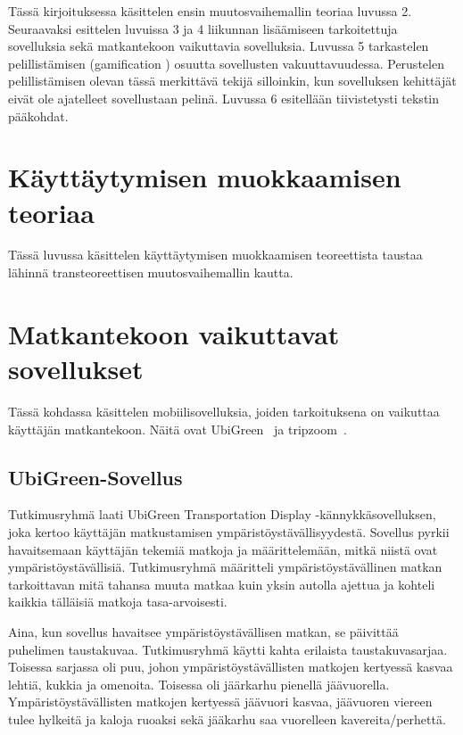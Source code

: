 \documentclass[finnish]{tktltiki2}
\theoremstyle{definition}
\theoremstyle{remark}
\begin{document}
Tässä kirjoituksessa käsittelen ensin muutosvaihemallin teoriaa luvussa 2.
Seuraavaksi esittelen luvuissa 3 ja 4 liikunnan lisäämiseen tarkoitettuja sovelluksia sekä matkantekoon vaikuttavia sovelluksia.
Luvussa 5 tarkastelen pelillistämisen (gamification \cite{gamification}) osuutta sovellusten vakuuttavuudessa.
Perustelen pelillistämisen olevan tässä merkittävä tekijä silloinkin, kun sovelluksen kehittäjät eivät ole ajatelleet sovellustaan pelinä.
Luvussa 6 esitellään tiivistetysti tekstin pääkohdat.

\section{Käyttäytymisen muokkaamisen teoriaa}

Tässä luvussa käsittelen käyttäytymisen muokkaamisen teoreettista taustaa lähinnä transteoreettisen muutosvaihemallin \cite{ttm} kautta.

\section{Matkantekoon vaikuttavat sovellukset}

Tässä kohdassa käsittelen mobiilisovelluksia, joiden tarkoituksena on vaikuttaa käyttäjän matkantekoon. Näitä ovat UbiGreen~\cite{ubigreen} ja tripzoom~\cite{tripzoom}.

\subsection{UbiGreen-Sovellus}

Tutkimusryhmä laati UbiGreen Transportation Display -kännykkäsovelluksen, joka kertoo käyttäjän matkustamisen ympäristöystävällisyydestä. Sovellus pyrkii havaitsemaan käyttäjän tekemiä matkoja ja määrittelemään, mitkä niistä ovat ympäristöystävällisiä. Tutkimusryhmä määritteli ympäristöystävällinen matkan tarkoittavan mitä tahansa muuta matkaa kuin yksin autolla ajettua ja kohteli kaikkia tälläisiä matkoja tasa-arvoisesti.

Aina, kun sovellus havaitsee ympäristöystävällisen matkan, se päivittää puhelimen taustakuvaa. Tutkimusryhmä käytti kahta erilaista taustakuvasarjaa. Toisessa sarjassa oli puu, johon ympäristöystävällisten matkojen kertyessä kasvaa lehtiä, kukkia ja omenoita. Toisessa oli jäärkarhu pienellä jäävuorella. Ympäristöystävällisten matkojen kertyessä jäävuori kasvaa, jäävuoren viereen tulee hylkeitä ja kaloja ruoaksi sekä jääkarhu saa vuorelleen kavereita/perhettä.
\end{document}
